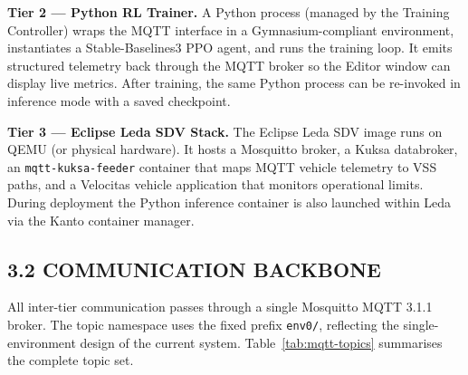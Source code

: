 \documentclass[12pt,a4paper]{article}
\begin{document}
\textbf{Tier 2 — Python RL Trainer.} A Python process (managed by the Training
Controller) wraps the MQTT interface in a Gymnasium-compliant environment,
instantiates a Stable-Baselines3 PPO agent, and runs the training loop. It
emits structured telemetry back through the MQTT broker so the Editor window
can display live metrics. After training, the same Python process can be
re-invoked in inference mode with a saved checkpoint.

\textbf{Tier 3 — Eclipse Leda SDV Stack.} The Eclipse Leda SDV image runs on
QEMU (or physical hardware). It hosts a Mosquitto broker, a Kuksa databroker,
an \texttt{mqtt-kuksa-feeder} container that maps MQTT vehicle telemetry to VSS
paths, and a Velocitas vehicle application that monitors operational limits.
During deployment the Python inference container is also launched within Leda
via the Kanto container manager.

\subsection*{3.2 \quad COMMUNICATION BACKBONE}

\indent All inter-tier communication passes through a single Mosquitto MQTT 3.1.1
broker. The topic namespace uses the fixed prefix \texttt{env0/}, reflecting the
single-environment design of the current system. Table~\ref{tab:mqtt-topics}
summarises the complete topic set.
\end{document}
